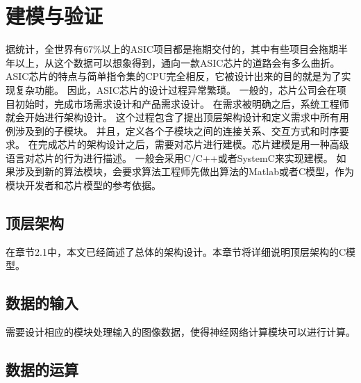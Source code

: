 
\chapter{建模与验证}

据统计，全世界有67\%以上的ASIC项目都是拖期交付的，其中有些项目会拖期半年以上，从这个数据可以想象得到，通向一款ASIC芯片的道路会有多么曲折。
ASIC芯片的特点与简单指令集的CPU完全相反，它被设计出来的目的就是为了实现复杂功能。
因此，ASIC芯片的设计过程异常繁琐。
一般的，芯片公司会在项目初始时，完成市场需求设计和产品需求设计。
在需求被明确之后，系统工程师就会开始进行架构设计。
这个过程包含了提出顶层架构设计和定义需求中所有用例涉及到的子模块。
并且，定义各个子模块之间的连接关系、交互方式和时序要求。
在完成芯片的架构设计之后，需要对芯片进行建模。芯片建模是用一种高级语言对芯片的行为进行描述。
一般会采用C/C++或者SystemC来实现建模。
如果涉及到新的算法模块，会要求算法工程师先做出算法的Matlab或者C模型，作为模块开发者和芯片模型的参考依据。

\section{顶层架构}
在章节2.1中，本文已经简述了总体的架构设计。本章节将详细说明顶层架构的C模型。


\section{数据的输入}
需要设计相应的模块处理输入的图像数据，使得神经网络计算模块可以进行计算。




\section{数据的运算}  


